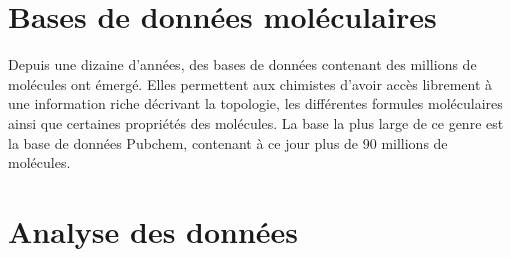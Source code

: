 \section{Bases de données moléculaires}
\par Depuis une dizaine d'années, des bases de données contenant des millions de molécules ont émergé. Elles permettent aux chimistes d'avoir accès librement à une information riche décrivant la topologie, les différentes formules moléculaires ainsi que certaines propriétés des molécules. La base la plus large de ce genre est la base de données Pubchem\cite{pubchem}, contenant à ce jour plus de 90 millions de molécules.

\section{Analyse des données}
